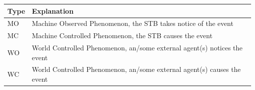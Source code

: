 \documentclass[11pt]{article}
\begin{document}
\begin{table}[H]
    \centering
    \setlength{\tabcolsep}{18pt}
    \renewcommand{\arraystretch}{1.2}
    \begin{tabularx}{\textwidth}{|>{\centering\hsize=0.3\hsize}X|>{\hsize=1.7\hsize}X|}
        \hline
        \textbf{Type} & \textbf{Explanation} \\
        \hline
        MO & Machine Observed Phenomenon, the STB takes notice of the event \\
        \hline
        MC & Machine Controlled Phenomenon, the STB causes the event \\
        \hline
        WO & World Controlled Phenomenon, an/some external agent(s) notices the event \\
        \hline
        WC & World Controlled Phenomenon, an/some external agent(s) causes the event \\
        \hline
    \end{tabularx}
    \label{tab:shared_phenomena_header}
\end{table}
\end{document}
